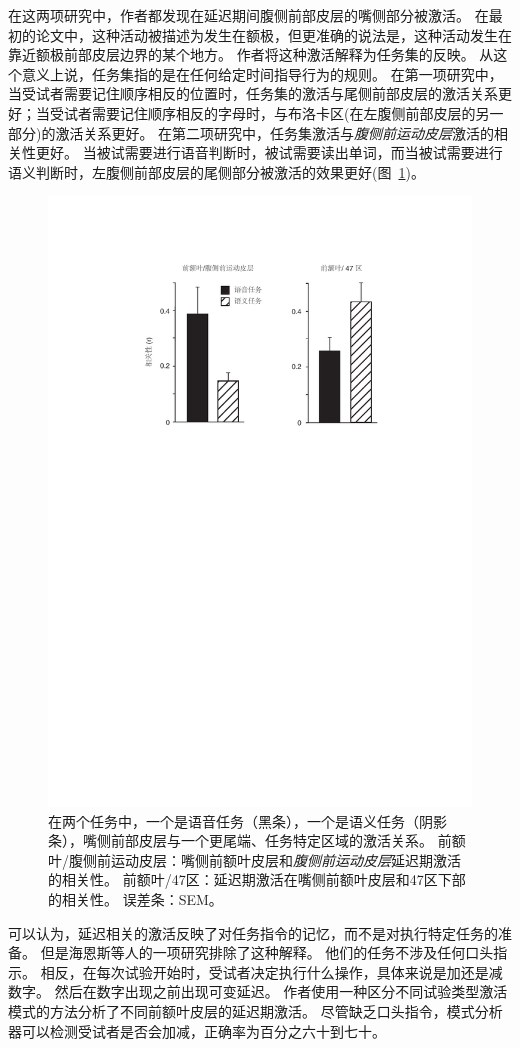 在这两项研究中，作者都发现在延迟期间腹侧前部皮层的嘴侧部分被激活。
在最初的论文中，这种活动被描述为发生在额极，但更准确的说法是，这种活动发生在靠近额极前部皮层边界的某个地方。
作者将这种激活解释为任务集的反映。
从这个意义上说，任务集指的是在任何给定时间指导行为的规则。
在第一项研究中，当受试者需要记住顺序相反的位置时，任务集的激活与尾侧前部皮层的激活关系更好；当受试者需要记住顺序相反的字母时，与布洛卡区(在左腹侧前部皮层的另一部分)的激活关系更好。
在第二项研究中，任务集激活与\textit{腹侧前运动皮层}激活的相关性更好。
当被试需要进行语音判断时，被试需要读出单词，而当被试需要进行语义判断时，左腹侧前部皮层的尾侧部分被激活的效果更好(图~\ref{fig:fig_9_4})。


\begin{figure}[!htb]
	\centering
	\includegraphics[width=0.55\linewidth]{chap9/9_4}
	\caption{在两个任务中，一个是语音任务（黑条），一个是语义任务（阴影条），嘴侧前部皮层与一个更尾端、任务特定区域的激活关系。
		前额叶/腹侧前运动皮层：嘴侧前额叶皮层和\textit{腹侧前运动皮层}延迟期激活的相关性。
		前额叶/47区：延迟期激活在嘴侧前额叶皮层和47区下部的相关性。
		误差条：SEM\cite{sakai2006prefrontal}。\label{fig:fig_9_4}}
\end{figure}
\par


可以认为，延迟相关的激活反映了对任务指令的记忆，而不是对执行特定任务的准备。
但是海恩斯等人的一项研究\cite{haynes2007reading}排除了这种解释。
他们的任务不涉及任何口头指示。
相反，在每次试验开始时，受试者决定执行什么操作，具体来说是加还是减数字。
然后在数字出现之前出现可变延迟。
作者使用一种区分不同试验类型激活模式的方法分析了不同前额叶皮层的延迟期激活。
尽管缺乏口头指令，模式分析器可以检测受试者是否会加减，正确率为百分之六十到七十。
\par



